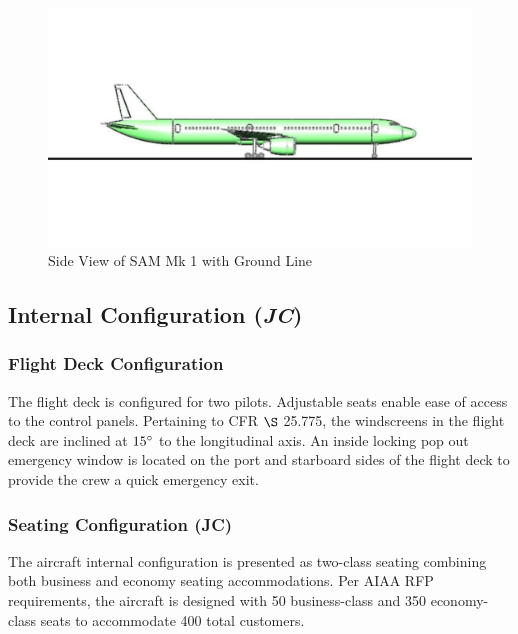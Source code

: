\begin{figure}[!h]
    \centering
    \includegraphics[width=1.0\textwidth]{Photos/Ground_Line.pdf}
    \caption{Side View of SAM Mk 1 with Ground Line}
    \label{grndline}
 \end{figure}

\subsection{Internal Configuration (\textit{JC})}
\label{section: internal config}
\subsubsection{Flight Deck Configuration}
The flight deck is configured for two pilots.  Adjustable seats enable ease of access to the control panels.  Pertaining to CFR $\S$ 25.775, the windscreens in the flight deck are inclined at $15\degree$ to the longitudinal axis.  An inside locking pop out emergency window is located on the port and starboard sides of the flight deck to provide the crew a quick emergency exit.


\subsubsection{Seating Configuration (JC)}
The aircraft internal configuration is presented as two-class seating combining both business and economy seating accommodations.  Per AIAA RFP \cite{RFP} requirements, the aircraft is designed with 50 business-class and 350 economy-class seats to accommodate 400 total customers.  

